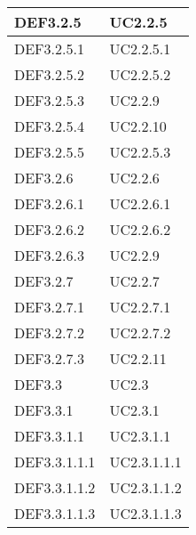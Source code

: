 \documentclass{scalatekids-article}
\begin{document}
\begin{longtable}[H]{|p{5.5cm}|p{5.5cm}|}
  \hline
  DEF3.2.5 & \multiLineCell[t]{UC2.2.5\\}\\
  \hline
  DEF3.2.5.1 & \multiLineCell[t]{UC2.2.5.1\\}\\
  \hline
  DEF3.2.5.2 & \multiLineCell[t]{UC2.2.5.2\\}\\
  \hline
  DEF3.2.5.3 & \multiLineCell[t]{UC2.2.9\\}\\
  \hline
  DEF3.2.5.4 & \multiLineCell[t]{UC2.2.10\\}\\
  \hline
  DEF3.2.5.5 & \multiLineCell[t]{UC2.2.5.3\\}\\
  \hline
  DEF3.2.6 & \multiLineCell[t]{UC2.2.6\\}\\
  \hline
  DEF3.2.6.1 & \multiLineCell[t]{UC2.2.6.1\\}\\
  \hline
  DEF3.2.6.2 & \multiLineCell[t]{UC2.2.6.2\\}\\
  \hline
  DEF3.2.6.3 & \multiLineCell[t]{UC2.2.9\\}\\
  \hline
  DEF3.2.7 & \multiLineCell[t]{UC2.2.7\\}\\
  \hline
  DEF3.2.7.1 & \multiLineCell[t]{UC2.2.7.1\\}\\
  \hline
  DEF3.2.7.2 & \multiLineCell[t]{UC2.2.7.2\\}\\
  \hline
  DEF3.2.7.3 & \multiLineCell[t]{UC2.2.11\\}\\
  \hline
  DEF3.3 & \multiLineCell[t]{UC2.3\\}\\
  \hline
  DEF3.3.1 & \multiLineCell[t]{UC2.3.1\\}\\
  \hline
  DEF3.3.1.1 & \multiLineCell[t]{UC2.3.1.1\\}\\
  \hline
  DEF3.3.1.1.1 & \multiLineCell[t]{UC2.3.1.1.1\\}\\
  \hline
  DEF3.3.1.1.2 & \multiLineCell[t]{UC2.3.1.1.2\\}\\
  \hline
  DEF3.3.1.1.3 & \multiLineCell[t]{UC2.3.1.1.3\\}\\

\end{longtable}
\end{document}
